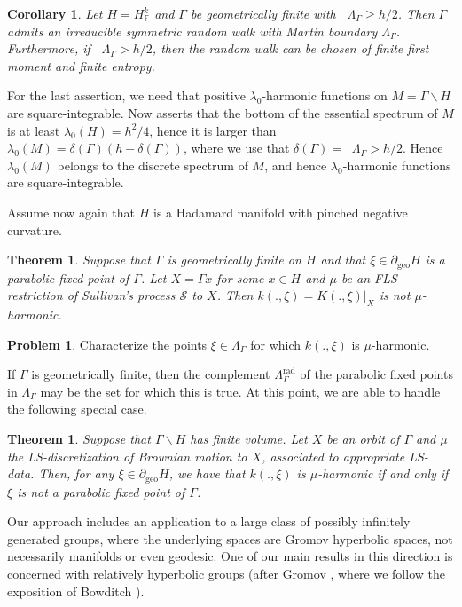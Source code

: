 \documentclass[12pt,a4paper]{amsart}
\newcounter{alph}
\newtheorem{theo}[alph]{Theorem}
\newtheorem{coro}[alph]{Corollary}
\numberwithin{equation}{section}
\theoremstyle{definition}
\newtheorem{prob}[alph]{Problem}
\DeclareMathOperator{\geo}{geo}
\DeclareMathOperator{\Hdim}{dim_{Hd}}
\DeclareMathOperator{\rad}{rad}
\def\F{\mathbb F}
\begin{document}
\begin{coro}\label{main3f}
Let $H=H_\F^k$ and $\Gamma$ be geometrically finite with $\Hdim\Lambda_\Gamma\ge h/2$.
Then $\Gamma$ admits an irreducible symmetric random walk with Martin boundary $\Lambda_\Gamma$.
Furthermore, if $\Hdim\Lambda_\Gamma>h/2$, then the random walk can be chosen of finite first moment and finite entropy.
\end{coro}

For the last assertion, we need that positive $\lambda_0$-harmonic functions on $M=\Gamma\backslash H$ are square-integrable.
Now \cite[Theorem B]{BP2} asserts that the bottom of the essential spectrum of $M$ is at least $\lambda_0(H)=h^2/4$, hence it is larger than $\lambda_0(M)=\delta(\Gamma)(h-\delta(\Gamma))$,
where we use that $\delta(\Gamma)=\Hdim\Lambda_\Gamma>h/2$.
Hence $\lambda_0(M)$ belongs to the discrete spectrum of $M$, and hence $\lambda_0$-harmonic functions are square-integrable.

Assume now again that $H$ is a Hadamard manifold with pinched negative curvature.

\begin{theo}\label{main5}
Suppose that $\Gamma$ is geometrically finite on $H$ and that $\xi\in\partial_{\geo}H$ is a parabolic fixed point of $\Gamma$.
Let $X=\Gamma x$ for some $x\in H$ and $\mu$ be an FLS-restriction of Sullivan's process $\mathcal S$ to $X$.
Then $k(.,\xi)=K(.,\xi)|_X$ is not $\mu$-harmonic.
\end{theo}

\begin{prob}
Characterize the points $\xi\in\Lambda_\Gamma$ for which $k(.,\xi)$ is $\mu$-harmonic.
\end{prob}

If $\Gamma$ is geometrically finite, then the complement $\Lambda_\Gamma^{\rad}$ of the parabolic fixed points in $\Lambda_\Gamma$ may be the set for which this is true.
At this point, we are able to handle the following special case.

\begin{theo}\label{main7}
Suppose that $\Gamma \backslash H$ has finite volume. Let $X$ be an orbit of $\Gamma$ and $\mu$ the LS-discretization of Brownian motion to $X$, associated to appropriate LS-data.
Then, for any $\xi \in \partial_{\geo}H$, we have that $k(.,\xi)$  is $\mu$-harmonic if and only if $\xi$ is not a parabolic fixed point of $\Gamma$.
\end{theo}

Our approach includes an application to a large class of possibly infinitely generated groups,
where the underlying spaces are Gromov hyperbolic spaces, not necessarily manifolds or even geodesic.
One of our main results in this direction is concerned with relatively hyperbolic groups (after Gromov \cite[Section 8.6]{Gro}, where we follow the exposition of Bowditch \cite{Bo1}).
\end{document}
